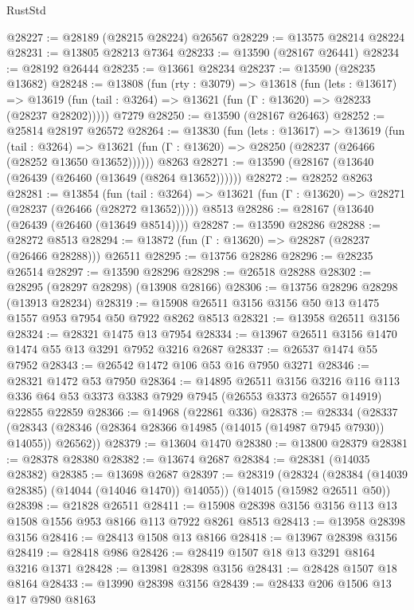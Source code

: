 \begin{lexlean}{RustStd}
\begin{coremodule}
@28227 := @28189 (@28215 @28224) @26567
@28229 := @13575 @28214 @28224
@28231 := @13805 @28213 @7364
@28233 := @13590 (@28167 @26441)
@28234 := @28192 @26444
@28235 := @13661 @28234
@28237 := @13590 (@28235 @13682)
@28248 := @13808
    (fun (rty : @3079) =>
    @13618
      (fun (lets : @13617) =>
      @13619 (fun (tail : @3264) => @13621 (fun (Γ : @13620) => @28233 (@28237 @28202)))))
    @7279
@28250 := @13590 (@28167 @26463)
@28252 := @25814 @28197 @26572
@28264 := @13830
    (fun (lets : @13617) =>
    @13619
      (fun (tail : @3264) =>
      @13621 (fun (Γ : @13620) => @28250 (@28237 (@26466 (@28252 @13650 @13652))))))
    @8263
@28271 := @13590 (@28167 (@13640 (@26439 (@26460 (@13649 (@8264 @13652))))))
@28272 := @28252 @8263
@28281 := @13854
    (fun (tail : @3264) => @13621 (fun (Γ : @13620) => @28271 (@28237 (@26466 (@28272 @13652)))))
    @8513
@28286 := @28167 (@13640 (@26439 (@26460 (@13649 @8514))))
@28287 := @13590 @28286
@28288 := @28272 @8513
@28294 := @13872 (fun (Γ : @13620) => @28287 (@28237 (@26466 @28288))) @26511
@28295 := @13756 @28286
@28296 := @28235 @26514
@28297 := @13590 @28296
@28298 := @26518 @28288
@28302 := @28295 (@28297 @28298) (@13908 @28166)
@28306 := @13756 @28296 @28298 (@13913 @28234)
@28319 := @15908 @26511 @3156 @3156 @50 @13 @1475 @1557 @953 @7954 @50 @7922 @8262 @8513
@28321 := @13958 @26511 @3156
@28324 := @28321 @1475 @13 @7954
@28334 := @13967 @26511 @3156 @1470 @1474 @55 @13 @3291 @7952 @3216 @2687
@28337 := @26537 @1474 @55 @7952
@28343 := @26542 @1472 @106 @53 @16 @7950 @3271
@28346 := @28321 @1472 @53 @7950
@28364 := @14895
    @26511
    @3156
    @3216
    @116
    @113
    @336
    @64
    @53
    @3373
    @3383
    @7929
    @7945
    (@26553 @3373 @26557 @14919)
    @22855
    @22859
@28366 := @14968 (@22861 @336)
@28378 := @28334
    (@28337 (@28343 (@28346 (@28364 @28366 @14985 (@14015 (@14987 @7945 @7930)) @14055)) @26562))
@28379 := @13604 @1470
@28380 := @13800 @28379
@28381 := @28378 @28380
@28382 := @13674 @2687
@28384 := @28381 (@14035 @28382)
@28385 := @13698 @2687
@28397 := @28319
    (@28324 (@28384 (@14039 @28385) (@14044 (@14046 @1470)) @14055))
    (@14015 (@15982 @26511 @50))
@28398 := @21828 @26511
@28411 := @15908 @28398 @3156 @3156 @113 @13 @1508 @1556 @953 @8166 @113 @7922 @8261 @8513
@28413 := @13958 @28398 @3156
@28416 := @28413 @1508 @13 @8166
@28418 := @13967 @28398 @3156
@28419 := @28418 @986
@28426 := @28419 @1507 @18 @13 @3291 @8164 @3216 @1371
@28428 := @13981 @28398 @3156
@28431 := @28428 @1507 @18 @8164
@28433 := @13990 @28398 @3156
@28439 := @28433 @206 @1506 @13 @17 @7980 @8163

\end{coremodule}
\end{lexlean}
